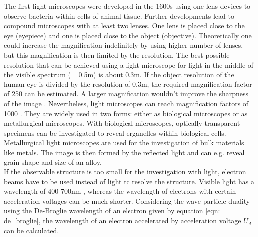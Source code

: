 The first light microscopes were developed in the 1600s using one-lens devices to observe bacteria within cells of animal tissue. Further developments lead to compound microscopes with at least two lenses. One lens is placed close to the eye (eyepiece) and one is placed close to the object (objective). Theoretically one could increase the magnification indefinitely by using higher number of lenses, but this magnification is then limited by the resolution. The best-possible resolution that can be achieved using a light microscope for light in the middle of the visible spectrum (\textlambda{}= 0.5\textmu m) is about 0.3\textmu m. If the object resolution of the human eye is divided by the resolution of 0.3\textmu m, the required magnification factor of 250 can be estimated. A larger magnification wouldn't improve the sharpness of the image \cite[p.6]{EGERTON_2016}. Nevertheless, light microscopes can reach magnification factors of 1000 \cite[p.550]{Weißbach_Dahms_Jaroschek_2015}. They are widely used in two forms: either as biological microscopes or as metallurgical microscopes. With biological microscopes, optically transparent specimens can be investigated to reveal organelles within biological cells. Metallurgical light microscopes are used for the investigation of bulk materials like metals. The image is then formed by the reflected light and can e.g. reveal grain shape and size of an alloy.\\

If the observable structure is too small for the investigation with light, electron beams have to be used instead of light to resolve the structure. Visible light has a wavelength of 400-700nm \cite[p.4]{Zwinkels2014}, whereas the wavelength of electrons with certain acceleration voltages can be much shorter. Considering the wave-particle duality using the De-Broglie wavelength of an electron given by equation \ref{eqn: de_broglie}, the wavelength of an electron accelerated by acceleration voltage $U_{A}$ can be calculated. 


